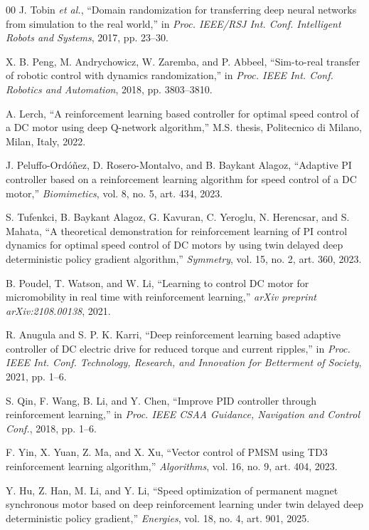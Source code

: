 \documentclass[conference]{IEEEtran}
\begin{document}
\begin{thebibliography}{00}
J. Tobin \emph{et al.}, ``Domain randomization for transferring deep neural networks from simulation to the real world,'' in \emph{Proc. IEEE/RSJ Int. Conf. Intelligent Robots and Systems}, 2017, pp. 23--30.

X. B. Peng, M. Andrychowicz, W. Zaremba, and P. Abbeel, ``Sim-to-real transfer of robotic control with dynamics randomization,'' in \emph{Proc. IEEE Int. Conf. Robotics and Automation}, 2018, pp. 3803--3810.

A. Lerch, ``A reinforcement learning based controller for optimal speed control of a DC motor using deep Q-network algorithm,'' M.S. thesis, Politecnico di Milano, Milan, Italy, 2022.

J. Peluffo-Ord\'{o}\~{n}ez, D. Rosero-Montalvo, and B. Baykant Alagoz, ``Adaptive PI controller based on a reinforcement learning algorithm for speed control of a DC motor,'' \emph{Biomimetics}, vol. 8, no. 5, art. 434, 2023.

S. Tufenkci, B. Baykant Alagoz, G. Kavuran, C. Yeroglu, N. Herencsar, and S. Mahata, ``A theoretical demonstration for reinforcement learning of PI control dynamics for optimal speed control of DC motors by using twin delayed deep deterministic policy gradient algorithm,'' \emph{Symmetry}, vol. 15, no. 2, art. 360, 2023.

B. Poudel, T. Watson, and W. Li, ``Learning to control DC motor for micromobility in real time with reinforcement learning,'' \emph{arXiv preprint arXiv:2108.00138}, 2021.

R. Anugula and S. P. K. Karri, ``Deep reinforcement learning based adaptive controller of DC electric drive for reduced torque and current ripples,'' in \emph{Proc. IEEE Int. Conf. Technology, Research, and Innovation for Betterment of Society}, 2021, pp. 1--6.

S. Qin, F. Wang, B. Li, and Y. Chen, ``Improve PID controller through reinforcement learning,'' in \emph{Proc. IEEE CSAA Guidance, Navigation and Control Conf.}, 2018, pp. 1--6.

F. Yin, X. Yuan, Z. Ma, and X. Xu, ``Vector control of PMSM using TD3 reinforcement learning algorithm,'' \emph{Algorithms}, vol. 16, no. 9, art. 404, 2023.

Y. Hu, Z. Han, M. Li, and Y. Li, ``Speed optimization of permanent magnet synchronous motor based on deep reinforcement learning under twin delayed deep deterministic policy gradient,'' \emph{Energies}, vol. 18, no. 4, art. 901, 2025.


\end{thebibliography}
\end{document}
